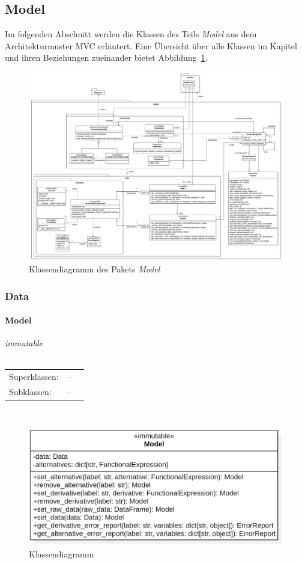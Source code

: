 \documentclass{article}
\newcommand{\classheader}[2][]{\paragraph{#2}
\mbox{}\textit{#1}\\\\}
\newcommand{\classref}[1]{\texttt{\nameref{cls:#1}}}
\begin{document}
\newpage
\subsection{Model}

Im folgenden Abschnitt werden die Klassen des Teils \emph{Model} aus dem Architekturmuster MVC erläutert. Eine Übersicht über alle Klassen im Kapitel und ihren Beziehungen zueinander bietet Abbildung~\ref{fig: ModelKlassendiagramm}.

\begin{figure}[H]%
    \centering
    \includegraphics[width=14cm]{entwurf/Entwurf_dokument/img/modelKlassendiagramm.png}
    \caption{Klassendiagramm des Pakets \emph{Model}}
    \label{fig: ModelKlassendiagramm}
\end{figure}



\newpage
\subsubsection{Data}
\classheader[\flqq{}immutable\frqq]{Model}\label{cls:Model}
\begin{tabular}{lll}
 Superklassen: & --\\
 Subklassen: & --\\
\end{tabular}\\
\begin{figure}[H]%
    \centering
    \includegraphics[width=13cm]{entwurf/Entwurf_dokument/img/cls/model/Model.png}
    \caption{Klassendiagramm \classref{Model}}
\end{figure}
\end{document}
